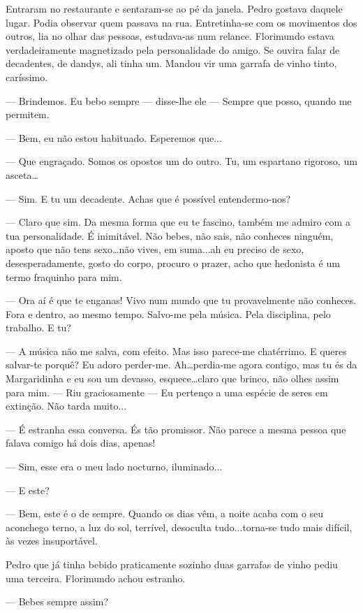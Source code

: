 Entraram no restaurante e sentaram-se ao pé da janela. Pedro gostava
daquele lugar. Podia observar quem passava na rua. Entretinha-se com os
movimentos dos outros, lia no olhar das pessoas, estudava-as num
relance. Florimundo estava verdadeiramente magnetizado pela
personalidade do amigo. Se ouvira falar de decadentes, de dandys, ali
tinha um. Mandou vir uma garrafa de vinho tinto, caríssimo.

--- Brindemos. Eu bebo sempre --- disse-lhe ele --- Sempre que posso, quando me
permitem.

--- Bem, eu não estou habituado. Esperemos que...

--- Que engraçado. Somos os opostos um do outro. Tu, um espartano
rigoroso, um asceta\ldots{}

--- Sim. E tu um decadente. Achas que é possível entendermo-nos?

--- Claro que sim. Da mesma forma que eu te fascino, também me admiro com
a tua personalidade. É inimitável. Não bebes, não sais, não conheces
ninguém, aposto que não tens sexo\ldots{}não vives, em suma...ah eu
preciso de sexo, desesperadamente, gosto do corpo, procuro o prazer,
acho que hedonista é um termo fraquinho para mim.

--- Ora aí é que te enganas! Vivo num mundo que tu provavelmente não
conheces. Fora e dentro, ao mesmo tempo. Salvo-me pela música. Pela
disciplina, pelo trabalho. E tu?

--- A música não me salva, com efeito. Mas isso parece-me chatérrimo. E
queres salvar-te porquê? Eu adoro perder-me. Ah\ldots{}perdia-me agora
contigo, mas tu és da Margaridinha e eu sou um devasso,
esquece\ldots{}claro que brinco, não olhes assim para mim. ---  Riu
graciosamente --- Eu pertenço a uma espécie de seres em extinção. Não
tarda muito...

--- É estranha essa conversa. És tão promissor. Não parece a mesma pessoa
que falava comigo há dois dias, apenas!

--- Sim, esse era o meu lado nocturno, iluminado...

--- E este?

--- Bem, este é o de sempre. Quando os dias vêm, a noite acaba com o seu
aconchego terno, a luz do sol, terrível, desoculta tudo...torna-se tudo
mais difícil, às vezes insuportável.

Pedro que já tinha bebido praticamente sozinho duas garrafas de vinho
pediu uma terceira. Florimundo achou estranho.

--- Bebes sempre assim?

